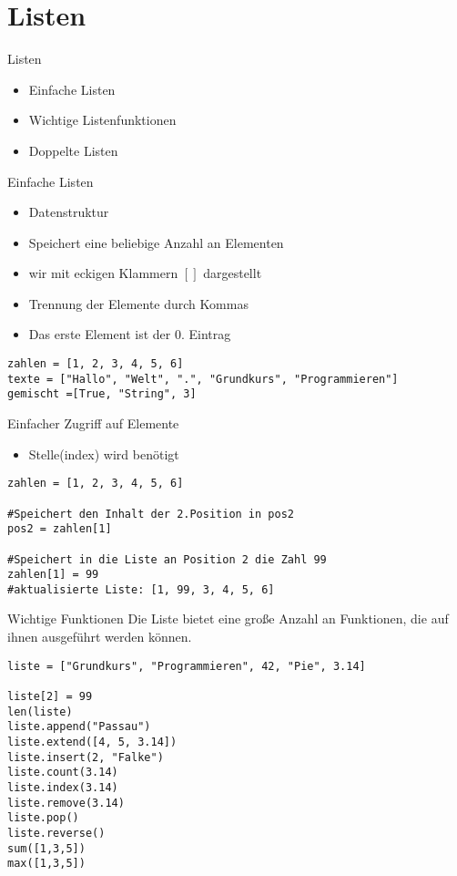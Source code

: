 \section{Listen}

\begin{frame}[fragile]{Listen}
\begin{itemize}
	\item Einfache Listen
	\item Wichtige Listenfunktionen
	\item Doppelte Listen
\end{itemize}
\end{frame}

\begin{frame}[fragile]{Einfache Listen}
	\begin{itemize}
		\item Datenstruktur
		\item Speichert eine beliebige Anzahl an Elementen
		\item wir mit eckigen Klammern $[ ]$ dargestellt
		\item Trennung der Elemente durch Kommas
		\item Das erste Element ist der 0. Eintrag 
		
	\end{itemize}
\begin{lstlisting}
zahlen = [1, 2, 3, 4, 5, 6]
texte = ["Hallo", "Welt", ".", "Grundkurs", "Programmieren"]
gemischt =[True, "String", 3]
\end{lstlisting}
\end{frame}

\begin{frame}[fragile]{Einfacher Zugriff auf Elemente}
\begin{itemize}
	\item Stelle(index) wird benötigt	
\end{itemize}
\begin{lstlisting}
zahlen = [1, 2, 3, 4, 5, 6]

#Speichert den Inhalt der 2.Position in pos2
pos2 = zahlen[1]

#Speichert in die Liste an Position 2 die Zahl 99
zahlen[1] = 99
#aktualisierte Liste: [1, 99, 3, 4, 5, 6]
\end{lstlisting}
\end{frame}

\begin{frame}[fragile]{Wichtige Funktionen}
Die Liste bietet eine große Anzahl an  Funktionen, die auf ihnen
ausgeführt werden können.

\begin{lstlisting}
liste = ["Grundkurs", "Programmieren", 42, "Pie", 3.14]

liste[2] = 99
len(liste)
liste.append("Passau")
liste.extend([4, 5, 3.14])
liste.insert(2, "Falke")
liste.count(3.14)
liste.index(3.14)
liste.remove(3.14)
liste.pop()
liste.reverse()
sum([1,3,5])
max([1,3,5])
\end{lstlisting}
\end{frame}


